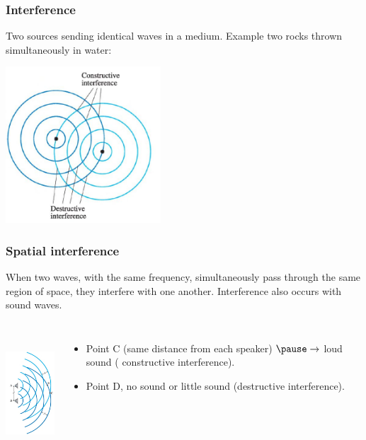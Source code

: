 \documentclass[]{beamer}
\begin{document}
\begin{frame}
\frametitle{Interference }

Two sources sending identical waves in a medium. \pause Example two rocks thrown simultaneously in water: 




  \begin{center}
  \includegraphics[height=2.3in]{images4/16.jpg}
\end{center}



  \end{frame}




\begin{frame}
  \frametitle{Spatial interference}
  
  When two waves, with the same frequency, simultaneously pass through the
  same region of space, they interfere with one another. Interference also occurs
  with sound waves.
  
  
  
    \begin{columns}[c]
     \column{2in}  %
    
  
    \begin{center}
    \includegraphics[height=1.8in]{images4/soundinterference.jpg}
  \end{center}
  
  
     \column{2in}
  
  \begin{itemize}
  \item  Point C (same distance from each speaker) $\pause \rightarrow$ loud sound ( constructive interference).
  \pause 
  
  \item Point  D, no sound or  little sound  (destructive interference).
  \end{itemize}
  
  
     \end{columns}
    \end{frame}
  
\end{document}
